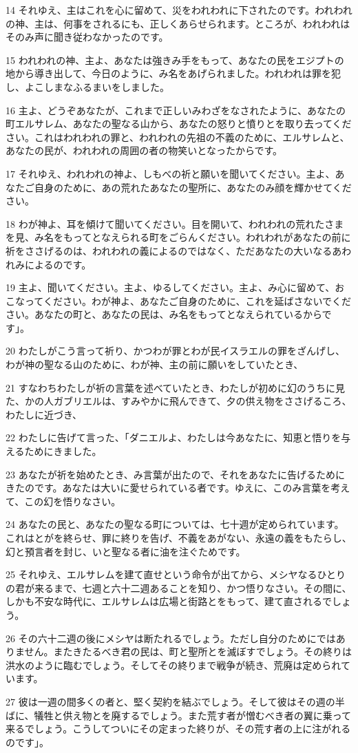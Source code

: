 \par 14 それゆえ、主はこれを心に留めて、災をわれわれに下されたのです。われわれの神、主は、何事をされるにも、正しくあらせられます。ところが、われわれはそのみ声に聞き従わなかったのです。
\par 15 われわれの神、主よ、あなたは強きみ手をもって、あなたの民をエジプトの地から導き出して、今日のように、み名をあげられました。われわれは罪を犯し、よこしまなふるまいをしました。
\par 16 主よ、どうぞあなたが、これまで正しいみわざをなされたように、あなたの町エルサレム、あなたの聖なる山から、あなたの怒りと憤りとを取り去ってください。これはわれわれの罪と、われわれの先祖の不義のために、エルサレムと、あなたの民が、われわれの周囲の者の物笑いとなったからです。
\par 17 それゆえ、われわれの神よ、しもべの祈と願いを聞いてください。主よ、あなたご自身のために、あの荒れたあなたの聖所に、あなたのみ顔を輝かせてください。
\par 18 わが神よ、耳を傾けて聞いてください。目を開いて、われわれの荒れたさまを見、み名をもってとなえられる町をごらんください。われわれがあなたの前に祈をささげるのは、われわれの義によるのではなく、ただあなたの大いなるあわれみによるのです。
\par 19 主よ、聞いてください。主よ、ゆるしてください。主よ、み心に留めて、おこなってください。わが神よ、あなたご自身のために、これを延ばさないでください。あなたの町と、あなたの民は、み名をもってとなえられているからです」。
\par 20 わたしがこう言って祈り、かつわが罪とわが民イスラエルの罪をざんげし、わが神の聖なる山のために、わが神、主の前に願いをしていたとき、
\par 21 すなわちわたしが祈の言葉を述べていたとき、わたしが初めに幻のうちに見た、かの人ガブリエルは、すみやかに飛んできて、夕の供え物をささげるころ、わたしに近づき、
\par 22 わたしに告げて言った、「ダニエルよ、わたしは今あなたに、知恵と悟りを与えるためにきました。
\par 23 あなたが祈を始めたとき、み言葉が出たので、それをあなたに告げるためにきたのです。あなたは大いに愛せられている者です。ゆえに、このみ言葉を考えて、この幻を悟りなさい。
\par 24 あなたの民と、あなたの聖なる町については、七十週が定められています。これはとがを終らせ、罪に終りを告げ、不義をあがない、永遠の義をもたらし、幻と預言者を封じ、いと聖なる者に油を注ぐためです。
\par 25 それゆえ、エルサレムを建て直せという命令が出てから、メシヤなるひとりの君が来るまで、七週と六十二週あることを知り、かつ悟りなさい。その間に、しかも不安な時代に、エルサレムは広場と街路とをもって、建て直されるでしょう。
\par 26 その六十二週の後にメシヤは断たれるでしょう。ただし自分のためにではありません。またきたるべき君の民は、町と聖所とを滅ぼすでしょう。その終りは洪水のように臨むでしょう。そしてその終りまで戦争が続き、荒廃は定められています。
\par 27 彼は一週の間多くの者と、堅く契約を結ぶでしょう。そして彼はその週の半ばに、犠牲と供え物とを廃するでしょう。また荒す者が憎むべき者の翼に乗って来るでしょう。こうしてついにその定まった終りが、その荒す者の上に注がれるのです」。

